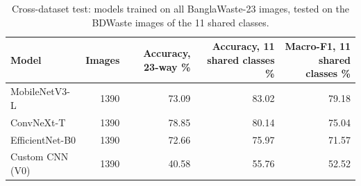 \begin{table}
\caption{Cross-dataset test: models trained on all BanglaWaste-23 images, tested on the BDWaste images of the 11 shared classes.}
\label{tab:table_bdwaste}
\begin{tabular}{lrrrr}
\toprule
Model & Images & Accuracy, 23-way \% & Accuracy, 11 shared classes \% & Macro-F1, 11 shared classes \% \\
\midrule
MobileNetV3-L & 1390 & 73.09 & 83.02 & 79.18 \\
ConvNeXt-T & 1390 & 78.85 & 80.14 & 75.04 \\
EfficientNet-B0 & 1390 & 72.66 & 75.97 & 71.57 \\
Custom CNN (V0) & 1390 & 40.58 & 55.76 & 52.52 \\
\bottomrule
\end{tabular}
\end{table}
